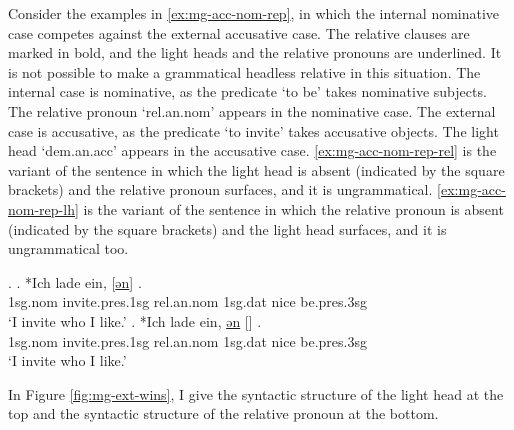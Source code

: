 Consider the examples in \ref{ex:mg-acc-nom-rep}, in which the internal nominative case competes against the external accusative case. The relative clauses are marked in bold, and the light heads and the relative pronouns are underlined. It is not possible to make a grammatical headless relative in this situation.
The internal case is nominative, as the predicate  `to be' takes nominative subjects. The relative pronoun  `\ac{rel}.\ac{an}.\ac{nom}' appears in the nominative case.
The external case is accusative, as the predicate  `to invite' takes accusative objects. The light head  `\ac{dem}.\ac{an}.\ac{acc}' appears in the accusative case.
\ref{ex:mg-acc-nom-rep-rel} is the variant of the sentence in which the light head is absent (indicated by the square brackets) and the relative pronoun surfaces, and it is ungrammatical.
\ref{ex:mg-acc-nom-rep-lh} is the variant of the sentence in which the relative pronoun is absent (indicated by the square brackets) and the light head surfaces, and it is ungrammatical too.

\ex.\label{ex:mg-acc-nom-rep}
\ag. *Ich {lade ein}, [\underline{ən}] \underline{}   .\\
1\ac{sg}.\ac{nom} invite.\ac{pres}.1\ac{sg}\scsub{[acc]} \ac{rel}.\ac{an}.\ac{nom} 1\ac{sg}.\ac{dat} nice be.\ac{pres}.3\ac{sg}\scsub{[nom]}\\
`I invite who I like.' \label{ex:mg-acc-nom-rep-rel}
\bg. *Ich {lade ein}, \underline{ən} [\underline{}]   .\\
1\ac{sg}.\ac{nom} invite.\ac{pres}.1\ac{sg}\scsub{[acc]} \ac{rel}.\ac{an}.\ac{nom} 1\ac{sg}.\ac{dat} nice be.\ac{pres}.3\ac{sg}\scsub{[nom]}\\
`I invite who I like.' \label{ex:mg-acc-nom-rep-lh}

In Figure \ref{fig:mg-ext-wins}, I give the syntactic structure of the light head at the top and the syntactic structure of the relative pronoun at the bottom.

